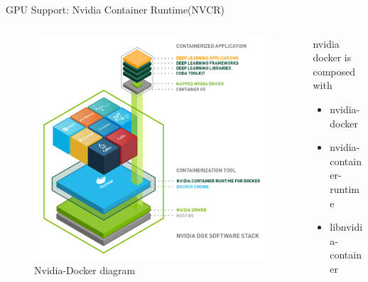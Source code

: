 \begin{frame}{GPU Support: Nvidia Container Runtime(NVCR)}
    \begin{columns}
        \begin{column}{0.7\textwidth}
            \begin{figure}
                \includegraphics[width=1\textwidth]{assets/dgx-docker-1024x970.png}
                \caption{Nvidia-Docker diagram}
            \end{figure}
        \end{column}
        \begin{column}{0.5\textwidth}
            \pause
            nvidia docker is composed with 
            \begin{itemize}
                \item nvidia-docker
                \item nvidia-container-runtime
                \item libnvidia-container
            \end{itemize}


        \end{column}
    \end{columns}
\end{frame}